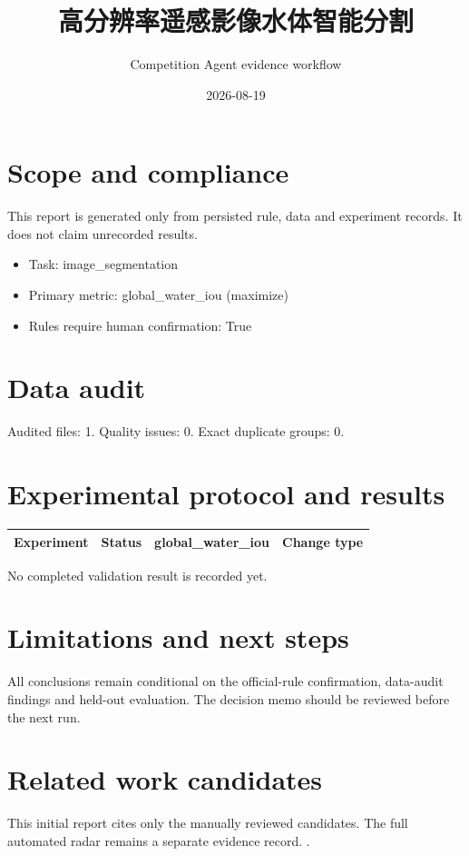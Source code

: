\documentclass[11pt]{ctexart}
\title{高分辨率遥感影像水体智能分割}
\author{Competition Agent evidence workflow}
\date{2026-08-19}
\begin{document}
\maketitle
\section{Scope and compliance}
This report is generated only from persisted rule, data and experiment records. It does not claim unrecorded results.
\begin{itemize}
\item Task: image\_segmentation
\item Primary metric: global\_water\_iou (maximize)
\item Rules require human confirmation: True
\end{itemize}
\section{Data audit}
Audited files: 1. Quality issues: 0. Exact duplicate groups: 0.
\section{Experimental protocol and results}
\begin{center}\begin{tabular}{llll}\toprule
Experiment & Status & global\_water\_iou & Change type \\ \midrule
\bottomrule\end{tabular}\end{center}
No completed validation result is recorded yet.
\section{Limitations and next steps}
All conclusions remain conditional on the official-rule confirmation, data-audit findings and held-out evaluation. The decision memo should be reviewed before the next run.
\section{Related work candidates}
This initial report cites only the manually reviewed candidates. The full automated radar remains a separate evidence record.
\cite{Xu2021FourierDG,Wei2024Rein,Gong2024CrossEarth,Duan2026DBFNet}.


\end{document}
